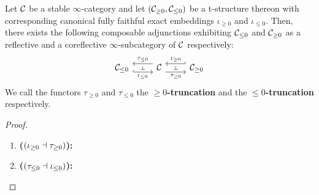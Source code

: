                 \begin{proposition} \label{prop: t_structures_and_localisations}
                    Let $\mathcal{C}$ be a stable $\infty$-category and let $(\mathcal{C}_{\geq 0}, \mathcal{C}_{\leq 0})$ be a t-structure thereon with corresponding canonical fully faithful exact embeddings $\iota_{\geq 0}$ and $\iota_{\leq 0}$. Then, there exists the following composable adjunctions exhibiting $\mathcal{C}_{\leq 0}$ and $\mathcal{C}_{\geq 0}$ as a reflective and a coreflective $\infty$-subcategory of $\mathcal{C}$ respectively:
                        $$
                            \begin{tikzcd}
                            	{\C_{\leq 0}} & \C & {\C_{\geq 0}}
                            	\arrow[""{name=0, anchor=center, inner sep=0}, "{\iota_{\leq 0}}"', shift right=2, hook, from=1-1, to=1-2]
                            	\arrow[""{name=1, anchor=center, inner sep=0}, "{\tau_{\leq 0}}"', shift right=2, from=1-2, to=1-1]
                            	\arrow[""{name=2, anchor=center, inner sep=0}, "{\tau_{\geq 0}}"', shift right=2, from=1-2, to=1-3]
                            	\arrow[""{name=3, anchor=center, inner sep=0}, "{\iota_{\geq 0}}"', shift right=2, hook', from=1-3, to=1-2]
                            	\arrow["\dashv"{anchor=center, rotate=-90}, draw=none, from=1, to=0]
                            	\arrow["\dashv"{anchor=center, rotate=-90}, draw=none, from=3, to=2]
                            \end{tikzcd}
                        $$
                    We call the functors $\tau_{\geq 0}$ and $\tau_{\leq 0}$ the \textbf{$\geq 0$-truncation} and the \textbf{$\leq 0$-truncation} respectively.
                \end{proposition}
                    \begin{proof}
                        \noindent
                        \begin{enumerate}
                            \item \textbf{($(\iota_{\geq 0} \dashv \tau_{\geq 0})$):}    
                            \item \textbf{($(\tau_{\leq 0} \dashv \iota_{\leq 0})$):} 
                        \end{enumerate}
                    \end{proof}
